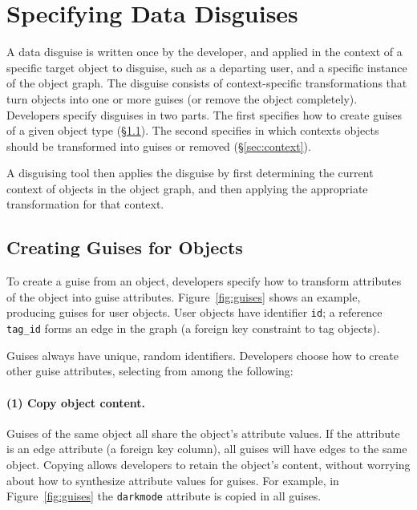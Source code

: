 \section{Specifying Data Disguises}
\label{sec:policies}

A data disguise is written once by the developer, and applied in the context of a specific target
object to disguise, such as a departing user, and a specific instance of the object graph.
%
The disguise consists of context-specific transformations that turn objects into one or
more guises (or remove the object completely). Developers specify disguises in two parts. The
first specifies how to create guises of a given object type (\S\ref{sec:guises}). The second specifies in which
contexts objects should be transformed into guises or removed (\S\ref{sec:context}).

A disguising tool then applies the disguise by first determining the current context of objects in the object
graph, and then applying the appropriate transformation for that context.

\subsection{Creating Guises for Objects}
\label{sec:guises}
%
To create a guise from an object, developers specify how to transform attributes of the
object into guise attributes.
%
Figure~\ref{fig:guises} shows an example, producing guises for user objects.
%
User objects have identifier \texttt{id}; a reference \texttt{tag\_id}
forms an edge in the graph (a foreign key constraint to tag objects).

%
Guises always have unique, random identifiers.
%
Developers choose how to create other guise attributes, selecting from among the following:
%
\paragraph{(1) Copy object content.}
%
Guises of the same object all share the object's attribute values.
%
If the attribute is an edge attribute (\eg a foreign key column), all guises will have
edges to the same object.
%
%
Copying allows developers to retain the object's content, without worrying about how to
synthesize attribute values for guises.
%
For example, in Figure~\ref{fig:guises} the \texttt{darkmode} attribute is copied in
all guises.

